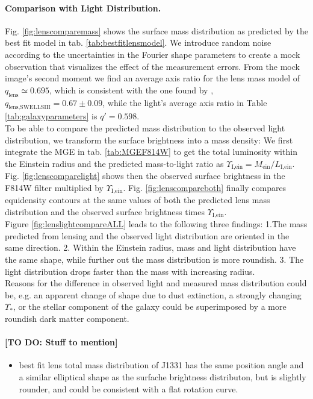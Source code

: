 \paragraph{Comparison with Light Distribution.} Fig. \ref{fig:lenscomparemass} shows the surface mass distribution as predicted by the best fit model in tab. \ref{tab:bestfitlensmodel}. We introduce random noise according to the uncertainties in the Fourier shape parameters to create a mock observation that visualizes the effect of the measurement errors. From the mock image's second moment we find an average axis ratio for the lens mass model of $q_\text{lens} \simeq 0.695$, which is consistent with the one found by \citet{SWELLSIII}, $q_\text{lens,SWELLSIII} = 0.67 \pm 0.09$, while the light's average axis ratio in Table \ref{tab:galaxyparameters} is $q' = 0.598$.
\\To be able to compare the predicted mass distribution to the observed light distribution, we transform the surface brightness into a mass density: We first integrate the MGE in tab. \ref{tab:MGEF814W} to get the total luminosity within the Einstein radius and the predicted mass-to-light ratio as $\Upsilon_\text{I,ein} = M_\text{ein} / L_\text{I,ein}$. Fig. \ref{fig:lenscomparelight} shows then the observed surface brightness in the F814W filter multiplied by $\Upsilon_\text{I,ein}$.  Fig. \ref{fig:lenscompareboth} finally compares equidensity contours at the same values of both the predicted lens mass distribution and the observed surface brightness times $\Upsilon_\text{I,ein}$.
\\Figure \ref{fig:lenslightcompareALL} leads to the following three findings: 1.The mass predicted from lensing and the observed light distribution are oriented in the same direction. 2. Within the Einstein radius, mass and light distribution have the same shape, while further out the mass distribution is more roundish. 3. The light distribution drops faster than the mass with increasing radius. 
\\Reasons for the difference in observed light and measured mass distribution could be, e.g. an apparent change of shape due to dust extinction, a strongly changing $\Upsilon_*$, or the stellar component of the galaxy could be superimposed by a more roundish dark matter component.

\paragraph{[TO DO: Stuff to mention]}
\begin{itemize}
\item best fit lens total mass distribution of J1331 has the same position angle and a similar elliptical shape as the surfache brightness distributon, but is slightly rounder, and could be consistent with a flat rotation curve.
\end{itemize}

